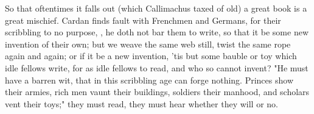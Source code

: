 So that oftentimes it falls out (which Callimachus taxed of old) a great book
is a great mischief. Cardan finds fault with Frenchmen and
Germans, for their scribbling to no purpose, , he doth not bar them to write, so that it be
some new invention of their own; but we weave the same web still, twist the
same rope again and again; or if it be a new invention, 'tis but some bauble or
toy which idle fellows write, for as idle fellows to read, and who so cannot
invent? "He must have a barren wit, that in this scribbling
age can forge nothing. Princes show their armies, rich men
vaunt their buildings, soldiers their manhood, and scholars vent their toys;"
they must read, they must hear whether they will or no.



